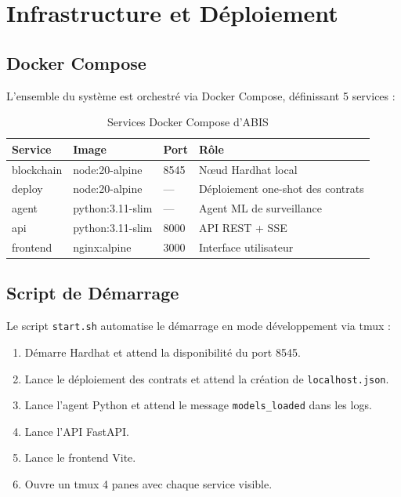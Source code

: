 \documentclass[12pt,a4paper]{report}
\newcommand{\code}[1]{\texttt{#1}}
\begin{document}
\section{Infrastructure et Déploiement}

\subsection{Docker Compose}

L'ensemble du système est orchestré via Docker Compose, définissant 5 services :

\begin{table}[H]
\centering
\caption{Services Docker Compose d'ABIS}
\label{tab:docker_services}
\begin{tabularx}{\linewidth}{L{3cm} L{3cm} L{2cm} L{5cm}}
\toprule
\textbf{Service} & \textbf{Image} & \textbf{Port} & \textbf{Rôle} \\
\midrule
blockchain & node:20-alpine & 8545 & Nœud Hardhat local \\
deploy & node:20-alpine & --- & Déploiement one-shot des contrats \\
agent & python:3.11-slim & --- & Agent ML de surveillance \\
api & python:3.11-slim & 8000 & API REST + SSE \\
frontend & nginx:alpine & 3000 & Interface utilisateur \\
\bottomrule
\end{tabularx}
\end{table}

\subsection{Script de Démarrage}

Le script \code{start.sh} automatise le démarrage en mode développement via tmux :
\begin{enumerate}
  \item Démarre Hardhat et attend la disponibilité du port 8545.
  \item Lance le déploiement des contrats et attend la création de \code{localhost.json}.
  \item Lance l'agent Python et attend le message \code{models\_loaded} dans les logs.
  \item Lance l'API FastAPI.
  \item Lance le frontend Vite.
  \item Ouvre un tmux 4 panes avec chaque service visible.
\end{enumerate}
\end{document}
